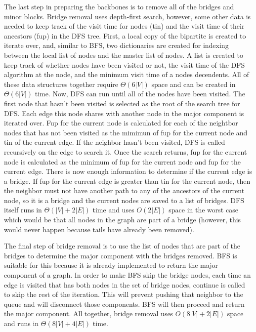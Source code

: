 \documentclass{article}
\begin{document}
        \par
        The last step in preparing the backbones is to remove all of the bridges and minor blocks. Bridge removal uses depth-first search, however, some other data is needed to keep track of the visit time for nodes (tin) and the visit time of their ancestors (fup) in the DFS tree. First, a local copy of the bipartite is created to iterate over, and, similar to BFS, two dictionaries are created for indexing between the local list of nodes and the master list of nodes. A list is created to keep track of whether nodes have been visited or not, the visit time of the DFS algorithm at the node, and the minimum visit time of a nodes decendents. All of these data structures together require $\Theta(6|V|)$ space and can be created in $\Theta(6|V|)$ time. Now, DFS can run until all of the nodes have been visited. The first node that hasn't been visited is selected as the root of the search tree for DFS. Each edge this node shares with another node in the major component is iterated over. Fup for the current node is calculated for each of the neightbor nodes that has not been visited as the mimimun of fup for the current node and tin of the current edge. If the neighbor hasn't been visited, DFS is called recursively on the edge to search it. Once the search returns, fup for the current node is calculated as the minimum of fup for the current node and fup for the current edge. There is now enough information to determine if the current edge is a bridge. If fup for the current edge is greater than tin for the current node, then the neighbor must not have another path to any of the ancestors of the current node, so it is a bridge and the current nodes are saved to a list of bridges. DFS itself runs in $\Theta(|V| + 2|E|)$ time and uses $O(2|E|)$ space in the worst case which would be that all nodes in the graph are part of a bridge (however, this would never happen because tails have already been removed).
        \par
        The final step of bridge removal is to use the list of nodes that are part of the bridges to determine the major component with the bridges removed. BFS is suitable for this because it is already implemented to return the major component of a graph. In order to make BFS skip the bridge nodes, each time an edge is visited that has both nodes in the set of bridge nodes, continue is called to skip the rest of the iteration. This will prevent pushing that neighbor to the queue and will disconnect those components. BFS will then proceed and return the major component. All together, bridge removal uses $O(8|V| + 2|E|)$ space and runs in $\Theta(8|V| + 4|E|)$ time.
\end{document}
